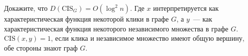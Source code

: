 Докажите, что $D(\mathrm{CIS}_G) = O(\log^2 n)$. Где $x$ интерпретируется как характеристическая функция
некоторой клики в графе $G$, а $y$~--- как характеристическая функция некоторого независимого множества в
графе $G$. $\mathrm{CIS}(x, y) = 1$, если клика и независимое множество имеют общую вершину, обе стороны
знают граф $G$.